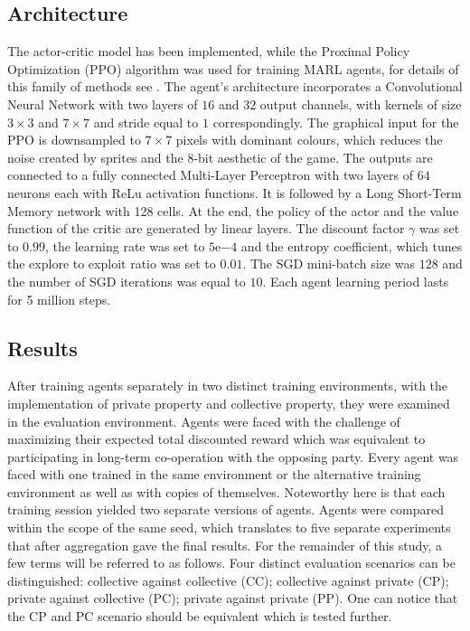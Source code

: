 \documentclass[preprint,12pt,authoryear]{elsarticle}
\begin{document}
\subsection{Architecture}
The actor-critic model has been implemented, while the Proximal Policy Optimization (PPO) algorithm was used for training MARL agents, for details of this family of methods see \cite{Schulman2017}. The agent's architecture incorporates a Convolutional Neural Network with two layers of $16$ and $32$ output channels, with kernels of size $3\times3$ and $7\times7$ and stride equal to $1$ correspondingly. The graphical input for the PPO is downsampled to $7\times7$ pixels with dominant colours, which reduces the noise created by sprites and the $8$-bit aesthetic of the game. The outputs are connected to a fully connected Multi-Layer Perceptron with two layers of $64$ neurons each with ReLu activation functions. It is followed by a Long Short-Term Memory network with 128 cells. At the end, the policy of the actor and the value function of the critic are generated by linear layers. The discount factor $\gamma$ was set to $0.99$, the learning rate was set to $5\mathrm{e}{-4}$ and the entropy coefficient, which tunes the explore to exploit ratio was set to $0.01$. The SGD mini-batch size was $128$ and the number of SGD iterations was equal to $10$. Each agent learning period lasts for 5 million steps.

\subsection{Results}

After training agents separately in two distinct training environments, with the implementation of private property and collective property, they were examined in the evaluation environment. Agents were faced with the challenge of maximizing their expected total discounted reward which was equivalent to participating in long-term co-operation with the opposing party. Every agent was faced with one trained in the same environment or the alternative training environment as well as with copies of themselves. Noteworthy here is that each training session yielded two separate versions of agents. Agents were compared within the scope of the same seed, which translates to five separate experiments that after aggregation gave the final results. For the remainder of this study, a few terms will be referred to as follows.
Four distinct evaluation scenarios can be distinguished: collective against collective (CC); collective against private (CP); private against collective (PC); private against private (PP). One can notice that the CP and PC scenario should be equivalent which is tested further.
\end{document}
